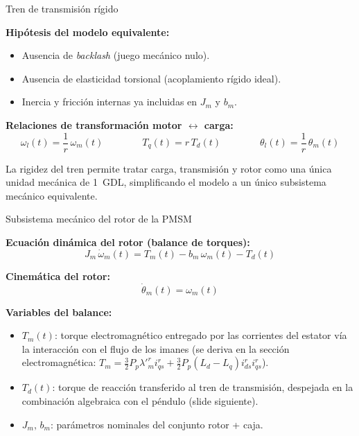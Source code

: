 \documentclass[aspectratio=169,t]{beamer}
\begin{document}
\begin{frame}{Tren de transmisión rígido}
\vspace{4mm}

\textbf{Hipótesis del modelo equivalente:}
\begin{itemize}
\item Ausencia de \textit{backlash} (juego mecánico nulo).
\item Ausencia de elasticidad torsional (acoplamiento rígido ideal).
\item Inercia y fricción internas ya incluidas en $J_m$ y $b_m$.
\end{itemize}

\vspace{4mm}
\textbf{Relaciones de transformación motor $\leftrightarrow$ carga:}
\begin{equation*}
\omega_l(t) = \frac{1}{r}\,\omega_m(t)
\qquad\qquad
T_q(t) = r\,T_d(t)
\qquad\qquad
\theta_l(t) = \frac{1}{r}\,\theta_m(t)
\end{equation*}

\vspace{4mm}
{\small La rigidez del tren permite tratar carga, transmisión y rotor como una única unidad mecánica de 1~GDL, simplificando el modelo a un único subsistema mecánico equivalente.}
\end{frame}

\begin{frame}{Subsistema mecánico del rotor de la PMSM}
\vspace{4mm}

\textbf{Ecuación dinámica del rotor (balance de torques):}
\begin{equation*}
J_m\,\dot{\omega}_m(t) = T_m(t) - b_m\,\omega_m(t) - T_d(t)
\end{equation*}

\textbf{Cinemática del rotor:}
\begin{equation*}
\dot{\theta}_m(t) = \omega_m(t)
\end{equation*}

\textbf{Variables del balance:}
\begin{itemize}
\item $T_m(t)$: torque electromagnético entregado por las corrientes del estator vía la interacción con el flujo de los imanes (se deriva en la sección electromagnética: $T_m = \tfrac{3}{2}P_p\lambda'^r_m i_{qs}^r + \tfrac{3}{2}P_p(L_d-L_q)i_{ds}^r i_{qs}^r$).
\item $T_d(t)$: torque de reacción transferido al tren de transmisión, despejada en la combinación algebraica con el péndulo (slide siguiente).
\item $J_m,\,b_m$: parámetros nominales del conjunto rotor + caja.
\end{itemize}
\end{frame}
\end{document}
